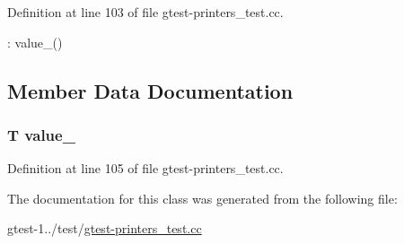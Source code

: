 \-Definition at line 103 of file gtest-\/printers\-\_\-test.\-cc.


\begin{DoxyCode}
: value_() {}
\end{DoxyCode}


\subsection{\-Member \-Data \-Documentation}
\hypertarget{classUnprintableTemplateInGlobal_ae496c0f6edafccdab7ef2e2b9d0c7e03}{
\subsubsection[{value\-\_\-}]{\setlength{\rightskip}{0pt plus 5cm}\-T {\bf value\-\_\-}}}\label{d6/ddd/classUnprintableTemplateInGlobal_ae496c0f6edafccdab7ef2e2b9d0c7e03}


\-Definition at line 105 of file gtest-\/printers\-\_\-test.\-cc.



\-The documentation for this class was generated from the following file\-:\begin{DoxyCompactItemize}
\item 
gtest-\/1../test/\hyperlink{gtest-printers__test_8cc}{gtest-\/printers\-\_\-test.\-cc}\end{DoxyCompactItemize}
